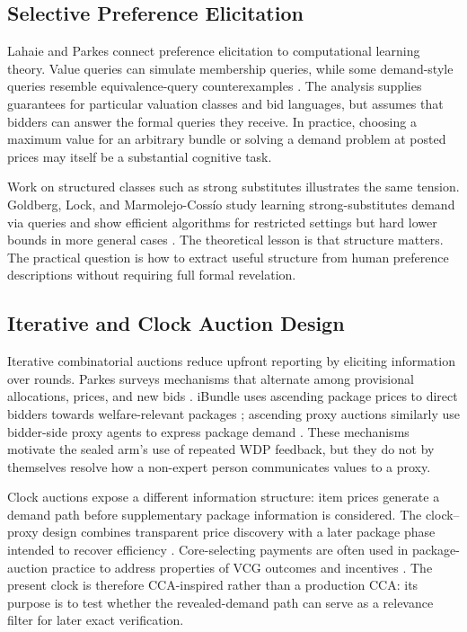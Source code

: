 \subsection{Selective Preference Elicitation}

Lahaie and Parkes connect preference elicitation to computational learning
theory. Value queries can simulate membership queries, while some demand-style
queries resemble equivalence-query counterexamples
\citep{lahaie2004applying}. The analysis supplies guarantees for particular
valuation classes and bid languages, but assumes that bidders can answer the
formal queries they receive. In practice, choosing a maximum value for an
arbitrary bundle or solving a demand problem at posted prices may itself be a
substantial cognitive task.

Work on structured classes such as strong substitutes illustrates the same tension. Goldberg, Lock, and Marmolejo-Cossío study learning strong-substitutes demand via queries and show efficient algorithms for restricted settings but hard lower bounds in more general cases \citep{goldberg2020learning}. The theoretical lesson is that structure matters. The practical question is how to extract useful structure from human preference descriptions without requiring full formal revelation.

\subsection{Iterative and Clock Auction Design}

Iterative combinatorial auctions reduce upfront reporting by eliciting
information over rounds. Parkes surveys mechanisms that alternate among
provisional allocations, prices, and new bids \citep{parkes2006iterative}.
iBundle uses ascending package prices to direct bidders towards
welfare-relevant packages \citep{parkes2000ibundle}; ascending proxy auctions
similarly use bidder-side proxy agents to express package demand
\citep{ausubel2006ascending}. These mechanisms motivate the sealed arm's use
of repeated WDP feedback, but they do not by themselves resolve how a
non-expert person communicates values to a proxy.

Clock auctions expose a different information structure: item prices generate
a demand path before supplementary package information is considered. The
clock--proxy design combines transparent price discovery with a later package
phase intended to recover efficiency \citep{ausubel2006clockproxy}. Core-selecting
payments are often used in package-auction practice to address properties of
VCG outcomes and incentives \citep{day2008core}. The present clock is therefore
CCA-inspired rather than a production CCA: its purpose is to test whether the
revealed-demand path can serve as a relevance filter for later exact
verification.

